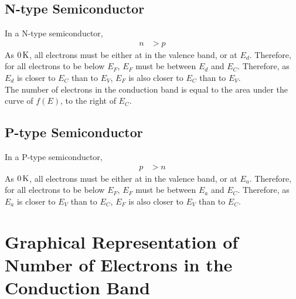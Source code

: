 \documentclass[titlepage, fleqn, a4paper, 12pt, twoside]{article}
\theoremstyle{definition}
\theoremstyle{theorem}
\begin{document}
\subsection{N-type Semiconductor}

In a N-type semiconductor,
\begin{align*}
	n & > p
\end{align*}
As $0 \kelvin$, all electrons must be either at in the valence band, or at $E_d$.
Therefore, for all electrons to be below $E_F$, $E_F$ must be between $E_d$ and $E_C$.
Therefore, as $E_d$ is closer to $E_C$ than to $E_V$, $E_F$ is also closer to $E_C$ than to $E_V$.\\
The number of electrons in the conduction band is equal to the area under the curve of $f(E)$, to the right of $E_C$.

\subsection{P-type Semiconductor}

In a P-type semiconductor,
\begin{align*}
	p & > n
\end{align*}
As $0 \kelvin$, all electrons must be either at in the valence band, or at $E_a$.
Therefore, for all electrons to be below $E_F$, $E_F$ must be between $E_a$ and $E_C$.
Therefore, as $E_a$ is closer to $E_V$ than to $E_C$, $E_F$ is also closer to $E_V$ than to $E_C$.

\section{Graphical Representation of Number of Electrons in the Conduction Band}
\end{document}
